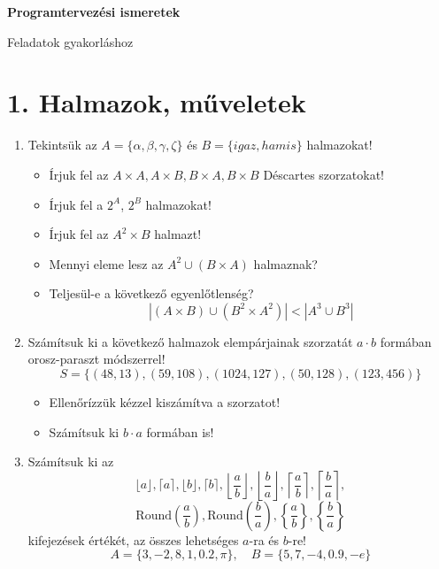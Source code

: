 \documentclass[a4paper]{article}
\begin{document}


\begin{center}
    \Huge \textbf{Programtervezési ismeretek}
    
	\bigskip
	
	\Large Feladatok gyakorláshoz
\end{center}

\bigskip

\section*{1. Halmazok, műveletek}

\begin{enumerate}

\item

Tekintsük az $A = \{\alpha, \beta, \gamma, \zeta\}$ és $B = \{igaz, hamis\}$ halmazokat!
\begin{itemize}
	\item Írjuk fel az $A \times A, A \times B, B \times A, B \times B$ Déscartes szorzatokat!
	\item Írjuk fel a $2^A$, $2^B$ halmazokat!
	\item Írjuk fel az $A^2 \times B$ halmazt!
	\item Mennyi eleme lesz az $A^2 \cup (B \times A)$ halmaznak?
	\item Teljesül-e a következő egyenlőtlenség?
	$$
	|(A \times B) \cup (B^2 \times A^2)| < |A^3 \cup B^3|
	$$
\end{itemize}

\item

Számítsuk ki a következő halmazok elempárjainak szorzatát $a \cdot b$ formában orosz-paraszt módszerrel!
$$
S = \{(48, 13), (59, 108), (1024, 127), (50, 128), (123, 456)\}
$$
\begin{itemize}
	\item Ellenőrízzük kézzel kiszámítva a szorzatot!
	\item Számítsuk ki $b \cdot a$ formában is!
\end{itemize}

\item

Számítsuk ki az
$$
\lfloor a \rfloor, \lceil a \rceil,
\lfloor b \rfloor, \lceil b \rceil,
\left\lfloor \dfrac{a}{b} \right\rfloor, \left\lfloor \dfrac{b}{a} \right\rfloor, 
\left\lceil \dfrac{a}{b} \right\rceil, \left\lceil \dfrac{b}{a} \right\rceil, 
$$
$$
\text{Round}\left( \dfrac{a}{b} \right),
\text{Round}\left( \dfrac{b}{a} \right),
\left\{ \dfrac{a}{b} \right\},
\left\{ \dfrac{b}{a} \right\}
$$
kifejezések értékét, az összes lehetséges $a$-ra és $b$-re!
$$
A = \{3, -2, 8, 1, 0.2, \pi\}, \quad
B = \{5, 7, -4, 0.9, -e\}
$$


\end{enumerate}
\end{document}
